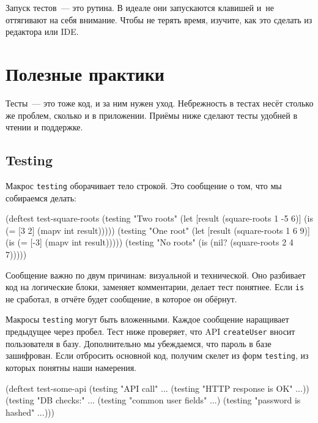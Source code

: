Запуск тестов~--- это рутина. В идеале они запускаются клавишей и~не оттягивают на
себя внимание. Чтобы не терять время, изучите, как это сделать из редактора или
IDE.

\section{Полезные практики}

Тесты~--- это тоже код, и за ним нужен уход. Небрежность в тестах несёт столько же
проблем, сколько и в приложении. Приёмы ниже сделают тесты удобней в чтении и
поддержке.

\subsection{Testing}


Макрос \verb|testing| оборачивает тело строкой. Это сообщение о том, что мы
собираемся делать:

\begin{english}
  \begin{clojure}
(deftest test-square-roots
  (testing "Two roots"
    (let [result (square-roots 1 -5 6)]
      (is (= [3 2] (mapv int result)))))
  (testing "One root"
    (let [result (square-roots 1 6 9)]
      (is (= [-3] (mapv int result)))))
  (testing "No roots"
    (is (nil? (square-roots 2 4 7)))))
  \end{clojure}
\end{english}

Сообщение важно по двум причинам: визуальной и технической. Оно разбивает код на
логические блоки, заменяет комментарии, делает тест понятнее. Если \verb|is|
не сработал, в отчёте будет сообщение, в которое он обёрнут.

Макросы \verb|testing| могут быть вложенными. Каждое сообщение наращивает
предыдущее через пробел. Тест ниже проверяет, что API \verb|createUser| вносит
пользователя в базу. Дополнительно мы убеждаемся, что пароль в базе
зашифрован. Если отбросить основной код, получим скелет из форм \verb|testing|,
из которых понятны наши намерения.

\begin{english}
  \begin{clojure}
(deftest test-some-api
  (testing "API call" ...
    (testing "HTTP response is OK" ...))
  (testing "DB checks:" ...
    (testing "common user fields" ...)
    (testing "password is hashed" ...)))
  \end{clojure}
\end{english}


